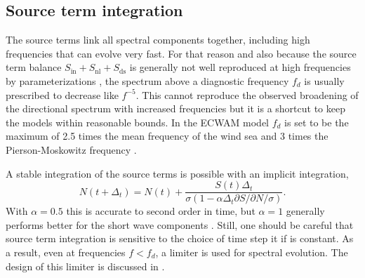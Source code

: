 \subsection{Source term integration}
The source terms link all spectral components together, including high frequencies that can evolve very fast. For that reason and also because the source term balance
$S_{\mathrm{in}}+S_{\mathrm{nl}}+S_{\mathrm{ds}}$ is generally not well reproduced at high frequencies by parameterizations \citep[e.g.][]{Zieger&al.2015}, 
the spectrum above a diagnostic frequency $f_d$ is usually prescribed to decrease like $f^{-5}$. This cannot reproduce the observed broadening of the directional
spectrum with increased frequencies \citep[e.g.][]{Banner&al.1989,Leckler&al.2015} but it is a shortcut to keep the models within reasonable bounds. 
In the ECWAM model 
$f_d$ is set to be the maximum of 2.5 times the mean frequency of the wind sea and 3 times the Pierson-Moskowitz frequency \citep{Bidlot2012}.

A stable integration of the source terms is possible with an implicit integration, 
\begin{equation}
 N(t+\Delta_t) = N(t) + \frac{S(t) \Delta_t}{\sigma(1 -   \alpha \Delta_t \partial S/\partial N / \sigma)}.
\end{equation}
With $ \alpha = 0.5$ this is accurate to second order in time, but $ \alpha = 1$ generally performs better for the short 
wave components \citep{Hargreaves&Annan2000}. Still, one should be careful that source term integration is sensitive to the choice of time step it if is constant. 
As a result, even at frequencies $f < f_d$, a limiter is used for spectral evolution. The design of this limiter is discussed in \cite{Tolman2002b}. 


